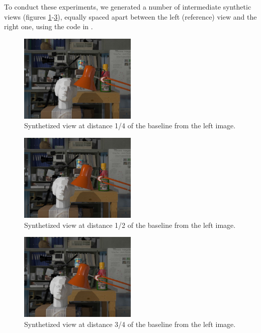 To conduct these experiments, we generated a number of intermediate synthetic views (figures \ref{fig:synt1/4}-\ref{fig:synt3/4}), equally spaced apart between the left (reference) view and the right one, using the code in \cite{VS}.\newline


\begin{figure}[h!]
\centering
\includegraphics[width=0.5\textwidth]{./img/synth_view1_25.jpg}
\caption{\small{Synthetized view at distance 1/4 of the baseline from the left image.}}
\label{fig:synt1/4}
\end{figure}
\begin{figure}[h!]
\centering
\includegraphics[width=0.5\textwidth]{./img/synth_view1_50.jpg}
\caption{\small{Synthetized view at distance 1/2 of the baseline from the left image. }}
\label{fig:synt1/2}
\end{figure}
\begin{figure}[h!]
\centering
\includegraphics[width=0.5\textwidth]{./img/synth_view1_75.jpg}
\caption{\small{Synthetized view at distance 3/4 of the baseline from the left image. }}
\label{fig:synt3/4}
\end{figure}

